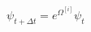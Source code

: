 \documentclass{minimal}
\begin{document}
    $\psi_{t+\Delta t}=e^{\Omega^{[i]}}\psi_t$
\end{document}
